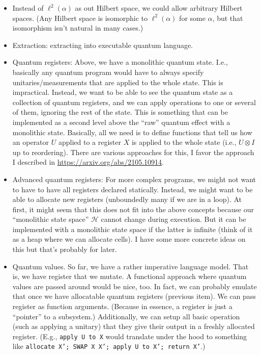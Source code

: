 \documentclass[a4paper]{article}
\newcommand\elltwo{\ell^2}
\newcommand\calH{\mathcal H}
\begin{document}
\begin{itemize}
\item Instead of $\elltwo(\alpha)$ as out Hilbert space, we could allow arbitrary Hilbert spaces. (Any Hilbert space is isomorphic to $\elltwo(\alpha)$ for some $\alpha$, but that isomorphism isn't natural in many cases.)
\item Extraction: extracting into executable quantum language.  
\item Quantum registers: Above, we have a monolithic quantum state. I.e., basically any quantum program would have to always specify unitaries/measurements that are applied to the whole state.
  This is impractical.
  Instead, we want to be able to see the quantum state as a collection of quantum registers, and we can apply operations to one or several of them, ignoring the rest of the state.
  This is something that can be implemented as a second level above the ``raw'' quantum effect with a monolithic state. Basically, all we need is to define functions that tell us how an operator $U$ applied to a register $X$ is applied to the whole state (i.e., $U\otimes I$ up to reordering).
  There are various approaches for this, I favor the approach I described in \url{https://arxiv.org/abs/2105.10914}.
\item Advanced quantum registers: For more complex programs, we might not want to have to have all registers declared statically. Instead, we might want to be able to allocate new registers (unboundedly many if we are in a loop). At first, it might seem that this does not fit into the above concepts because our ``monolithic state space'' $\calH$ cannot change during execution.
  But it can be implemented with a monolithic state space if the latter is infinite (think of it as a heap where we can allocate cells).
  I have some more concrete ideas on this but that's probably for later.
\item Quantum values. So far, we have a rather imperative language model. That is, we have register that we mutate.
  A functional approach where quantum values are passed around would be nice, too.
  In fact, we can probably emulate that once we have allocatable quantum registers (previous item).
  We can pass register as function arguments. (Because in essence, a register is just a ``pointer'' to a subsystem.)
  Additionally, we can setup all basic operation (such as applying a unitary) that they give their output in a freshly allocated register.
  (E.g., \texttt{apply U to X} would translate under the hood to something like \texttt{allocate X'; SWAP X X'; apply U to X'; return X'}.)

\end{itemize}
\end{document}
